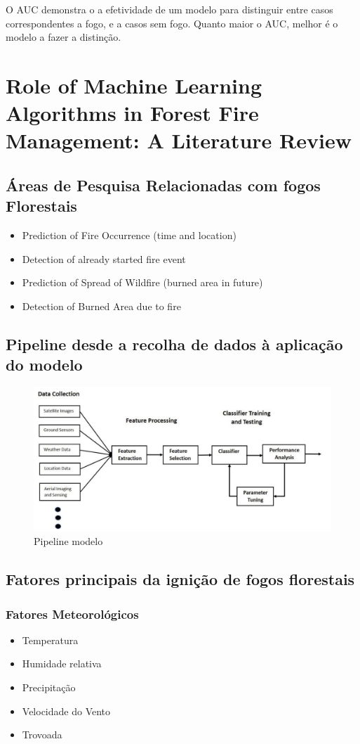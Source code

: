 \documentclass{article}
\begin{document}
O AUC demonstra o a efetividade de um modelo para distinguir entre casos correspondentes a fogo, e a casos sem fogo. Quanto maior o AUC, melhor é o modelo a fazer a distinção.


\section{Role of Machine Learning Algorithms in Forest Fire 
Management: A Literature Review \cite{arif2021role}}

\subsection{Áreas de Pesquisa Relacionadas com fogos Florestais}
\begin{itemize}
    \item Prediction of Fire Occurrence (time and location)
    \item Detection of already started fire event
    \item Prediction of Spread of Wildfire (burned area in future)
    \item Detection of Burned Area due to fire
\end{itemize}

\subsection{Pipeline desde a recolha de dados à aplicação do modelo}
\begin{figure}[ht]
 \centering
  \includegraphics[width=0.80\linewidth]{imgs/pipelina_data_ml.png}
   \caption{\label{fig:pipeline_modelo}Pipeline modelo}
\end{figure}

\subsection{Fatores principais da ignição de fogos florestais}
\subsubsection{Fatores Meteorológicos}
\begin{itemize}
    \item Temperatura
    \item Humidade relativa
    \item Precipitação
    \item Velocidade do Vento
    \item Trovoada
\end{itemize}
\end{document}
